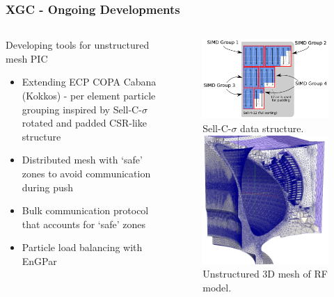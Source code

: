 \documentclass[aspectratio=169]{beamer}
\begin{document}
\begin{frame}
  \frametitle{XGC - Ongoing Developments}
  \begin{columns}
    \begin{column}{0.5\textwidth}
      Developing tools for unstructured mesh PIC
      \begin{itemize}
        \item Extending ECP COPA Cabana (Kokkos) - per element particle grouping 
          inspired by Sell-C-$\sigma$ rotated and padded CSR-like structure
        \item Distributed mesh with `safe' zones to avoid communication during
          push
        \item Bulk communication protocol that accounts for `safe' zones
        \item Particle load balancing with EnGPar
      \end{itemize}
    \end{column}
    \begin{column}{0.5\textwidth}
      \begin{figure}
        \centering
        \includegraphics[width=.6\textwidth]{figures/sellCSigma.png}\\
        \small{Sell-C-$\sigma$ data structure.} \smallskip \\
        \includegraphics[width=.4\textwidth]{figures/rfMesh.png}\\
        \small{Unstructured 3D mesh of RF model.}
      \end{figure}
    \end{column}
  \end{columns}
\end{frame}
\end{document}
